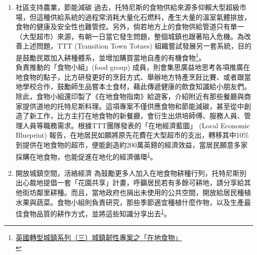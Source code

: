 \documentclass[a4paper,12pt]{article}
\begin{document}
\begin{enumerate}
\item 社區支持農業，節能減碳
\label{sec:org9bf854d}
過去，托特尼斯的食物供給來源多仰賴大型超級市場，但這種供給系統的過程常消耗大量化石燃料，產生大量的溫室氣體排放，食物的健康及安全性也難管控。另外，倘若地方上的食物供給管道只有單一（大型超市）來源，有朝一日當它發生問題，整個城鎮也跟著陷入危機。為改善上述問題，TTT (Transition Town Totnes) 組織嘗試發展另一套系統，目的是鼓勵民眾加入耕種體系，並增加購買當地自產的有機食物\footnote{\href{https://lowestc.blogspot.com/2017/02/blog-post\_6.html}{英國轉型城鎮系列（三）城鎮韌性專案之「在地食物」 }\\\label{orgdca718b}}。\\

負責推動的「食物小組」(food group) 成員，則會集思廣益地思考各項推廣在地食物的點子，比方研發更好的烹飪方式、舉辦地方特產烹飪比賽、或者跟當地學校合作，鼓勵師生品嘗本土食材，藉此傳遞健康的飲食知識給小朋友們。除此，食物小組還印製了《在地食物指南》給遊客，介紹附近有那些餐廳與商家提供道地的托特尼斯料理。這項專案不僅供應食物和節能減碳，甚至從中創造了新工作，比方主打在地食物的新餐廳，會衍生出烘培師傅、服務人員、管理人員等職務需求。根據TTT團隊發表的「在地經濟藍圖」 (Local Economic Blueprint) 報告，在地居民如願將原先花費在大型超市的支出，轉移其中10\%到提供在地食物的超市，便能創造約200萬英鎊的經濟效益，當居民願意多家採購在地食物，也能促進在地化的經濟循環\textsuperscript{\ref{orgdca718b}}。\\
\item 開放城鎮空間，活絡經濟
\label{sec:org507f2a4}
為鼓勵更多人加入在地食物耕種行列，托特尼斯別出心裁地提倡一套「花園共享」計畫，呼籲居民若有多餘可耕地，請分享給其他街坊鄰里耕種。而且，當地政府也捐出未使用的公共空間，開放給居民種植水果與蔬菜。食物小組則負責研究，那些季節適宜種植什麼作物，以及生產最佳食物品質的耕作方式，並將這些知識分享出去\textsuperscript{\ref{orgdca718b}}。\\


\end{enumerate}
\end{document}

